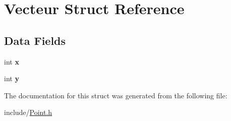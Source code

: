 \hypertarget{struct_vecteur}{\section{Vecteur Struct Reference}
\label{struct_vecteur}
}
\subsection*{Data Fields}
\begin{DoxyCompactItemize}
\item 
\hypertarget{struct_vecteur_a6150e0515f7202e2fb518f7206ed97dc}{int {\bfseries x}}\label{struct_vecteur_a6150e0515f7202e2fb518f7206ed97dc}

\item 
\hypertarget{struct_vecteur_a0a2f84ed7838f07779ae24c5a9086d33}{int {\bfseries y}}\label{struct_vecteur_a0a2f84ed7838f07779ae24c5a9086d33}

\end{DoxyCompactItemize}


The documentation for this struct was generated from the following file\+:\begin{DoxyCompactItemize}
\item 
include/\hyperlink{_point_8h}{Point.\+h}\end{DoxyCompactItemize}
